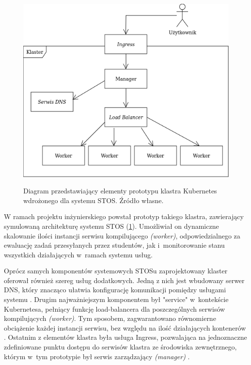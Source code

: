 \begin{figure}[!h]
	\begin{center}
		\resizebox{0.7\textwidth}{!} {
			\includegraphics{img/4/k8s.png}
		}
		\caption[Diagram prototypu klastra Kubernetes]{Diagram przedstawiający elementy prototypu klastra Kubernetes wdrożonego dla systemu STOS. Źródło własne.}
		\label{diagramk8s}
	\end{center}
\end{figure}

W ramach projektu inżynierskiego powstał prototyp takiego klastra, zawierający symulowaną architekturę systemu STOS (\ref{diagramk8s}). Umożliwiał on dynamiczne skalowanie ilości instancji serwisu kompilującego \textit{(worker)}, odpowiedzialnego za ewaluację zadań przesyłanych przez studentów, jak i~monitorowanie stanu wszystkich działających w~ramach systemu usług.

Oprócz samych komponentów systemowych STOSu zaprojektowany klaster oferował również szereg usług dodatkowych. Jedną z nich jest wbudowany serwer DNS, który znacząco ułatwia konfigurację komunikacji pomiędzy usługami systemu \cite{k8sDns}. Drugim najważniejszym komponentem był "service" w~kontekście Kubernetesa, pełniący funkcję load-balancera dla poszczególnych serwisów kompilujących \textit{(worker)}. Tym sposobem, zagwarantowano równomierne obciążenie każdej instancji serwisu, bez względu na ilość działających kontenerów \cite{k8sService}. Ostatnim z elementów klastra była usługa Ingress, pozwalająca na jednoznaczne zdefiniowane punktu dostępu do serwisów klastra ze środowiska zewnętrznego, którym w~tym prototypie był serwis zarządzający \textit{(manager)} \cite{k8sIngress}.

